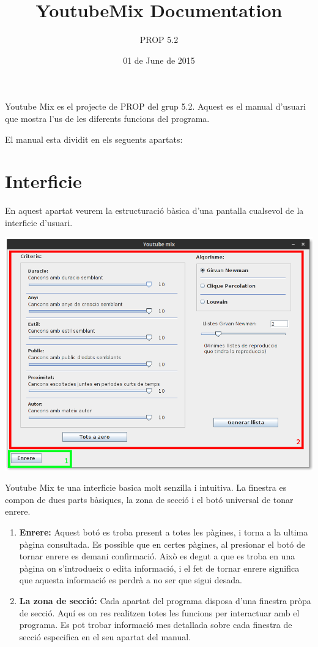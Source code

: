 \documentclass[letterpaper,10pt,oneside]{sphinxmanual}
\title{YoutubeMix Documentation}
\date{01 de June de 2015}
\author{PROP 5.2}
\begin{document}
\maketitle
\tableofcontents
{}\label{index::doc}


Youtube Mix es el projecte de PROP del grup 5.2. Aquest es el manual d'usuari que mostra l'us de les diferents funcions del programa.

El manual esta dividit en els seguents apartats:


\chapter{Interficie}
\label{interficie:interficie}\label{interficie::doc}\label{interficie:manual-d-usuari-de-youtube-mix}
En aquest apartat veurem la estructuració bàsica d'una pantalla cualsevol de la interficie d'usuari.

\includegraphics{interficie.png}

Youtube Mix te una interficie basica molt senzilla i intuitiva.
La finestra es compon de dues parts bàsiques, la zona de secció i el botó universal de tonar enrere.
\begin{enumerate}
\item {} 
\textbf{Enrere:} Aquest botó es troba present a totes les pàgines, i torna a la ultima pàgina consultada. Es possible que en certes pàgines, al presionar el botó de tornar enrere es demani confirmació. Això es degut a que es troba en una pàgina on s'introdueix o edita informació, i el fet de tornar enrere significa que aquesta informació es perdrà a no ser que sigui desada.

\item {} 
\textbf{La zona de secció:} Cada apartat del programa disposa d'una finestra pròpa de secció. Aquí es on res realitzen totes les funcions per interactuar amb el programa. Es pot trobar informació mes detallada sobre cada finestra de secció especifica en el seu apartat del manual.

\end{enumerate}
\end{document}
